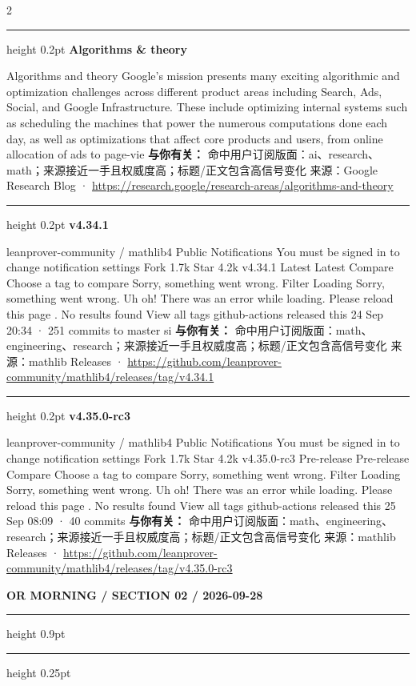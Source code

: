 \documentclass[10.5pt]{ctexart}
\begin{document}
\begin{multicols}{2}
\vspace{2mm}
\hrule height 0.2pt
\vspace{2mm}
{\large\bfseries Algorithms \& theory}\par
Algorithms and theory Google’s mission presents many exciting algorithmic and optimization challenges across different product areas including Search, Ads, Social, and Google Infrastructure. These include optimizing internal systems such as scheduling the machines that power the numerous computations done each day, as well as optimizations that affect core products and users, from online allocation of ads to page-vie
\textbf{与你有关：} 命中用户订阅版面：ai、research、math；来源接近一手且权威度高；标题/正文包含高信号变化
{\footnotesize\color{ormuted} 来源：Google Research Blog · \url{https://research.google/research-areas/algorithms-and-theory}}
\vspace{2mm}
\hrule height 0.2pt
\vspace{2mm}
{\large\bfseries v4.34.1}\par
leanprover-community / mathlib4 Public Notifications You must be signed in to change notification settings Fork 1.7k Star 4.2k v4.34.1 Latest Latest Compare Choose a tag to compare Sorry, something went wrong. Filter Loading Sorry, something went wrong. Uh oh! There was an error while loading. Please reload this page . No results found View all tags github-actions released this 24 Sep 20:34 · 251 commits to master si
\textbf{与你有关：} 命中用户订阅版面：math、engineering、research；来源接近一手且权威度高；标题/正文包含高信号变化
{\footnotesize\color{ormuted} 来源：mathlib Releases · \url{https://github.com/leanprover-community/mathlib4/releases/tag/v4.34.1}}
\vspace{2mm}
\hrule height 0.2pt
\vspace{2mm}
{\large\bfseries v4.35.0-rc3}\par
leanprover-community / mathlib4 Public Notifications You must be signed in to change notification settings Fork 1.7k Star 4.2k v4.35.0-rc3 Pre-release Pre-release Compare Choose a tag to compare Sorry, something went wrong. Filter Loading Sorry, something went wrong. Uh oh! There was an error while loading. Please reload this page . No results found View all tags github-actions released this 25 Sep 08:09 · 40 commits
\textbf{与你有关：} 命中用户订阅版面：math、engineering、research；来源接近一手且权威度高；标题/正文包含高信号变化
{\footnotesize\color{ormuted} 来源：mathlib Releases · \url{https://github.com/leanprover-community/mathlib4/releases/tag/v4.35.0-rc3}}
\end{multicols}
\newpage
{\small\bfseries OR MORNING / SECTION 02 / 2026-09-28}
\vspace{2mm}
\hrule height 0.9pt
\vspace{1.5mm}
\hrule height 0.25pt
\vspace{4mm}
\end{document}
